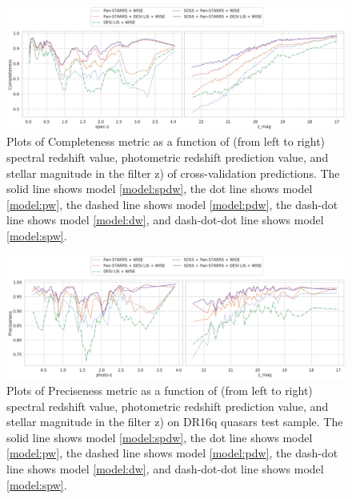 \documentclass[fleqn,usenatbib]{mnras}
\begin{document}
\begin{figure}
    \centering
    \includegraphics[width=0.9\linewidth]{images/metrics-comp-cv2.png}
    \caption{Plots of Completeness metric as a function of (from left to right) spectral redshift value, photometric redshift prediction value, and stellar magnitude in the filter z) of cross-validation predictions. The solid line shows model \ref{model:spdw}, the dot line shows model \ref{model:pw}, the dashed line shows model \ref{model:pdw}, the dash-dot line shows model \ref{model:dw}, and dash-dot-dot line shows model \ref{model:spw}.}
    \label{fig:metrics-comp-cv2-total}
\end{figure}

\begin{figure}
    \centering
    \includegraphics[width=0.9\linewidth]{images/metrics-prec-dr16q.png}
    \caption{Plots of Preciseness metric as a function of (from left to right) spectral redshift value, photometric redshift prediction value, and stellar magnitude in the filter z) on DR16q quasars test sample. The solid line shows model \ref{model:spdw}, the dot line shows model \ref{model:pw}, the dashed line shows model \ref{model:pdw}, the dash-dot line shows model \ref{model:dw}, and dash-dot-dot line shows model \ref{model:spw}.}
    \label{fig:metrics-prec-dr16q}
\end{figure}
\end{document}
